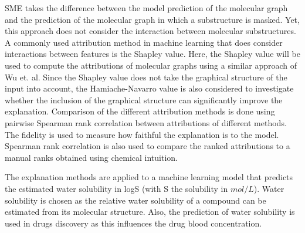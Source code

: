 SME takes the difference between the model prediction of the molecular graph and 
the prediction of the molecular graph in which a substructure is masked. Yet, 
this approach does not consider the interaction between molecular substructures.
A commonly used attribution method in machine learning that does consider 
interactions between features is the Shapley value. Here, the Shapley value\cite{shapley1953value} will 
be used to compute the attributions of molecular graphs using a similar approach 
of Wu et. al. Since the Shapley value does not take the graphical structure of 
the input into account, the Hamiache-Navarro value\cite{hamiache_value_1999} 
is also considered to investigate whether the inclusion of the graphical structure 
can significantly improve the explanation. Comparison of the different attribution 
methods is done using pairwise Spearman rank correlation between attributions of 
different methods. The fidelity\cite{carvalho2019machine} is used to measure 
how faithful the explanation is to the model. Spearman rank correlation is also 
used to compare the ranked attributions to a manual ranks obtained using chemical 
intuition. 


The explanation methods are applied to a machine learning model that predicts the 
estimated water solubility in logS (with S the solubility in $mol/L$). Water 
solubility is chosen as the relative water solubility of a compound can be estimated 
from its molecular structure. Also, the prediction of water solubility is used 
in drugs discovery as this influences the drug blood concentration.\cite{hill2010getting}
